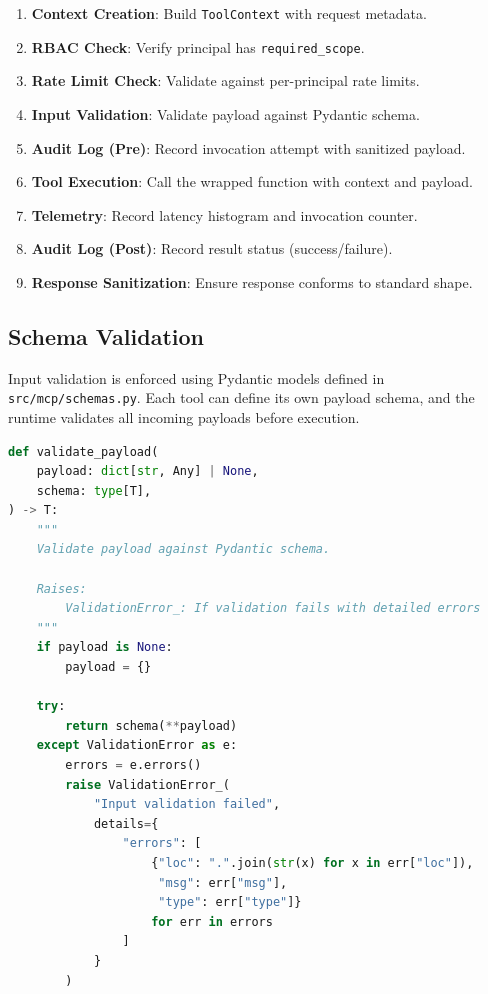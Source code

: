 \begin{enumerate}
    \item \textbf{Context Creation}: Build \texttt{ToolContext} with request metadata.
    \item \textbf{RBAC Check}: Verify principal has \texttt{required\_scope}.
    \item \textbf{Rate Limit Check}: Validate against per-principal rate limits.
    \item \textbf{Input Validation}: Validate payload against Pydantic schema.
    \item \textbf{Audit Log (Pre)}: Record invocation attempt with sanitized payload.
    \item \textbf{Tool Execution}: Call the wrapped function with context and payload.
    \item \textbf{Telemetry}: Record latency histogram and invocation counter.
    \item \textbf{Audit Log (Post)}: Record result status (success/failure).
    \item \textbf{Response Sanitization}: Ensure response conforms to standard shape.
\end{enumerate}

\subsection{Schema Validation}
\label{subsec:schema-validation}

Input validation is enforced using Pydantic models defined in \texttt{src/mcp/schemas.py}. Each tool can define its own payload schema, and the runtime validates all incoming payloads before execution.

\begin{lstlisting}[language=Python, caption={Payload validation function}, label={lst:payload-validation}]
def validate_payload(
    payload: dict[str, Any] | None,
    schema: type[T],
) -> T:
    """
    Validate payload against Pydantic schema.
    
    Raises:
        ValidationError_: If validation fails with detailed errors
    """
    if payload is None:
        payload = {}
    
    try:
        return schema(**payload)
    except ValidationError as e:
        errors = e.errors()
        raise ValidationError_(
            "Input validation failed",
            details={
                "errors": [
                    {"loc": ".".join(str(x) for x in err["loc"]),
                     "msg": err["msg"],
                     "type": err["type"]}
                    for err in errors
                ]
            }
        )
\end{lstlisting}


